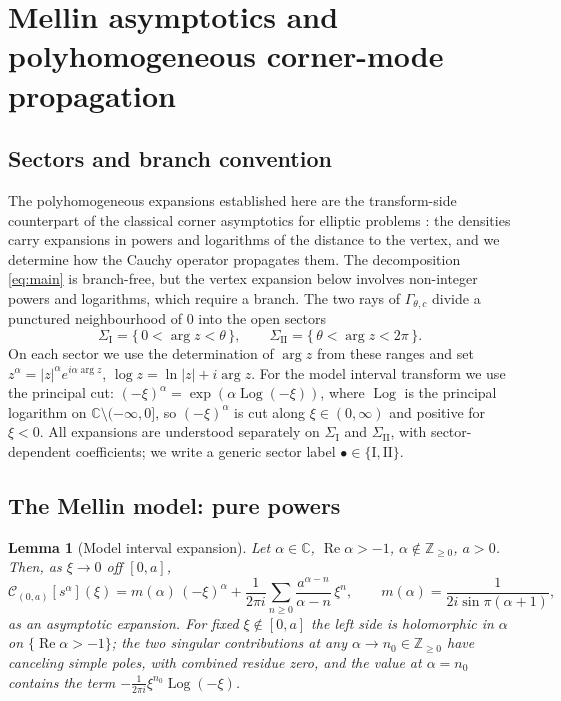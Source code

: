 \documentclass[pdflatex,sn-mathphys-num]{sn-jnl}%
\newcommand{\C}{\mathbb{C}}
\newcommand{\Z}{\mathbb{Z}}
\newcommand{\Cau}{\mathcal{C}}
\newcommand{\Gw}{\Gamma_{\theta,c}}
\newcommand{\Real}{\operatorname{Re}}
\newcommand{\Log}{\operatorname{Log}}
\theoremstyle{thmstyleone}
\newtheorem{lemma}[theorem]{Lemma}
\theoremstyle{thmstyletwo}
\theoremstyle{thmstylethree}
\begin{document}
\section{Mellin asymptotics and polyhomogeneous corner-mode propagation}
\label{sec:propagation}

\subsection{Sectors and branch convention}
The polyhomogeneous expansions established here are the transform-side
counterpart of the classical corner asymptotics for elliptic problems
\cite{grisvard2011elliptic,kozlov1997elliptic,dauge2006elliptic,costabel2003asymptotics,schulze1990mellin}: the densities carry expansions in
powers and logarithms of the distance to the vertex, and we determine how the
Cauchy operator propagates them. The decomposition \eqref{eq:main} is
branch-free, but the vertex expansion below involves non-integer powers and
logarithms, which require a branch. The two rays of $\Gw$ divide a punctured
neighbourhood of $0$ into the open sectors
\[
  \Sigma_{\mathrm I}=\{\,0<\arg z<\theta\,\},\qquad
  \Sigma_{\mathrm{II}}=\{\,\theta<\arg z<2\pi\,\}.
\]
On each sector we use the determination of $\arg z$ from these ranges and set
$z^{\alpha}=|z|^{\alpha}e^{i\alpha\arg z}$, $\log z=\ln|z|+i\arg z$. For the
model interval transform we use the principal cut: $(-\xi)^{\alpha}
=\exp(\alpha\Log(-\xi))$, where $\Log$ is the principal logarithm on
$\C\setminus(-\infty,0]$, so $(-\xi)^{\alpha}$ is cut along $\xi\in(0,\infty)$
and positive for $\xi<0$. All expansions are understood separately on
$\Sigma_{\mathrm I}$ and $\Sigma_{\mathrm{II}}$, with sector-dependent
coefficients; we write a generic sector label $\bullet\in\{\mathrm I,\mathrm{II}\}$.

\subsection{The Mellin model: pure powers}

\begin{lemma}[Model interval expansion]\label{lem:model}
Let $\alpha\in\C$, $\Real\alpha>-1$, $\alpha\notin\Z_{\ge0}$, $a>0$. Then, as
$\xi\to0$ off $[0,a]$,
\begin{equation}\label{eq:model}
  \Cau_{(0,a)}[s^{\alpha}](\xi)
  =m(\alpha)\,(-\xi)^{\alpha}
   +\frac{1}{2\pi i}\sum_{n\ge0}\frac{a^{\alpha-n}}{\alpha-n}\,\xi^{n},
   \qquad m(\alpha)=\frac{1}{2i\sin\pi(\alpha+1)},
\end{equation}
as an asymptotic expansion. For fixed $\xi\notin[0,a]$ the left side is
holomorphic in $\alpha$ on $\{\Real\alpha>-1\}$; the two singular contributions
at any $\alpha\to n_0\in\Z_{\ge0}$ have canceling simple poles, with combined
residue zero, and the value at $\alpha=n_0$ contains the term
$-\tfrac{1}{2\pi i}\xi^{n_0}\Log(-\xi)$.
\end{lemma}
\end{document}

